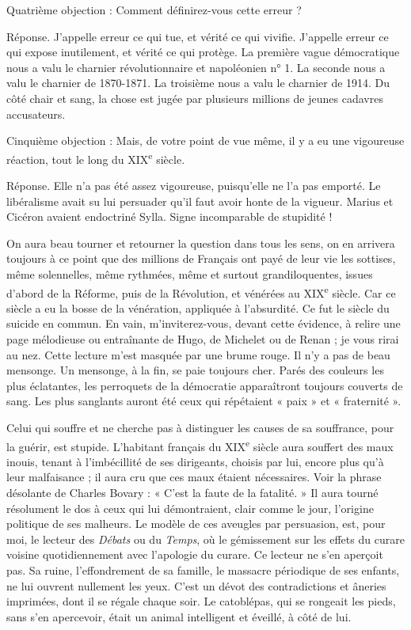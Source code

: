 \documentclass[french,twoside]{book} %
\begin{document}
Quatrième objection : Comment définirez-vous cette erreur ?\par
Réponse. J’appelle erreur ce qui tue, et vérité ce qui vivifie. J’appelle erreur ce qui expose inutilement, et vérité ce qui protège. La première vague démocratique nous a valu le charnier révolutionnaire et napoléonien n° 1. La seconde nous a valu le charnier de 1870-1871. La troisième nous a valu le charnier de 1914. Du côté chair et sang, la chose est jugée par plusieurs millions de jeunes cadavres accusateurs.\par
Cinquième objection : Mais, de votre point de vue même, il y a eu une vigoureuse réaction, tout le long du XIX\textsuperscript{e} siècle.\par
Réponse. Elle n’a pas été assez vigoureuse, puisqu’elle ne l’a pas emporté. Le libéralisme avait su lui persuader qu’il faut avoir honte de la vigueur. Marius et Cicéron avaient endoctriné Sylla. Signe incomparable de stupidité !\par
On aura beau tourner et retourner la question dans tous les sens, on en arrivera toujours à ce point que des millions de Français ont payé de leur vie les sottises, même solennelles, même rythmées, même et surtout grandiloquentes, issues d’abord de la Réforme, puis de la Révolution, et vénérées au XIX\textsuperscript{e} siècle. Car ce siècle a eu la bosse de la vénération, appliquée à l’absurdité. Ce fut le siècle du suicide en commun. En vain, m’inviterez-vous, devant cette évidence, à relire une page mélodieuse ou entraînante de Hugo, de Michelet ou de Renan ; je vous rirai au nez. Cette lecture m’est masquée par une brume rouge. Il n’y a pas de beau mensonge. Un mensonge, à la fin, se paie toujours cher. Parés des couleurs les plus éclatantes, les perroquets de la démocratie apparaîtront toujours couverts de sang. Les plus sanglants auront été ceux qui répétaient « paix » et « fraternité ».\par
Celui qui souffre et ne cherche pas à distinguer les causes de sa souffrance, pour la guérir, est stupide. L’habitant français du XIX\textsuperscript{e} siècle aura souffert des maux inouis, tenant à l’imbécillité de ses dirigeants, choisis par lui, encore plus qu’à leur malfaisance ; il aura cru que ces maux étaient nécessaires. Voir la phrase désolante de Charles Bovary : « C’est la faute de la fatalité. » Il aura tourné résolument le dos à ceux qui lui démontraient, clair comme le jour, l’origine politique de ses malheurs. Le modèle de ces aveugles par persuasion, est, pour moi, le lecteur des {\itshape Débats} ou du {\itshape Temps}, où le gémissement sur les effets du curare voisine quotidiennement avec l’apologie du curare. Ce lecteur ne s’en aperçoit pas. Sa ruine, l’effondrement de sa famille, le massacre périodique de ses enfants, ne lui ouvrent nullement les yeux. C’est un dévot des contradictions et âneries imprimées, dont il se régale chaque soir. Le catoblépas, qui se rongeait les pieds, sans s’en apercevoir, était un animal intelligent et éveillé, à côté de lui.\par
\end{document}
